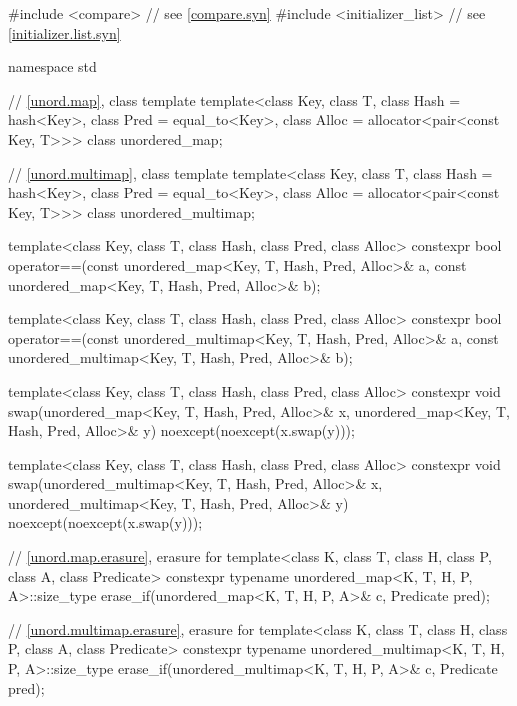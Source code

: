 %
%
%
\begin{codeblock}
#include <compare>              // see \ref{compare.syn}
#include <initializer_list>     // see \ref{initializer.list.syn}

namespace std {
  // \ref{unord.map}, class template 
  template<class Key,
           class T,
           class Hash = hash<Key>,
           class Pred = equal_to<Key>,
           class Alloc = allocator<pair<const Key, T>>>
    class unordered_map;

  // \ref{unord.multimap}, class template 
  template<class Key,
           class T,
           class Hash = hash<Key>,
           class Pred = equal_to<Key>,
           class Alloc = allocator<pair<const Key, T>>>
    class unordered_multimap;

  template<class Key, class T, class Hash, class Pred, class Alloc>
    constexpr bool operator==(const unordered_map<Key, T, Hash, Pred, Alloc>& a,
                              const unordered_map<Key, T, Hash, Pred, Alloc>& b);

  template<class Key, class T, class Hash, class Pred, class Alloc>
    constexpr bool operator==(const unordered_multimap<Key, T, Hash, Pred, Alloc>& a,
                              const unordered_multimap<Key, T, Hash, Pred, Alloc>& b);

  template<class Key, class T, class Hash, class Pred, class Alloc>
    constexpr void swap(unordered_map<Key, T, Hash, Pred, Alloc>& x,
                        unordered_map<Key, T, Hash, Pred, Alloc>& y)
      noexcept(noexcept(x.swap(y)));

  template<class Key, class T, class Hash, class Pred, class Alloc>
    constexpr void swap(unordered_multimap<Key, T, Hash, Pred, Alloc>& x,
                        unordered_multimap<Key, T, Hash, Pred, Alloc>& y)
      noexcept(noexcept(x.swap(y)));

  // \ref{unord.map.erasure}, erasure for 
  template<class K, class T, class H, class P, class A, class Predicate>
    constexpr typename unordered_map<K, T, H, P, A>::size_type
      erase_if(unordered_map<K, T, H, P, A>& c, Predicate pred);

  // \ref{unord.multimap.erasure}, erasure for 
  template<class K, class T, class H, class P, class A, class Predicate>
    constexpr typename unordered_multimap<K, T, H, P, A>::size_type
      erase_if(unordered_multimap<K, T, H, P, A>& c, Predicate pred);

}
\end{codeblock}
